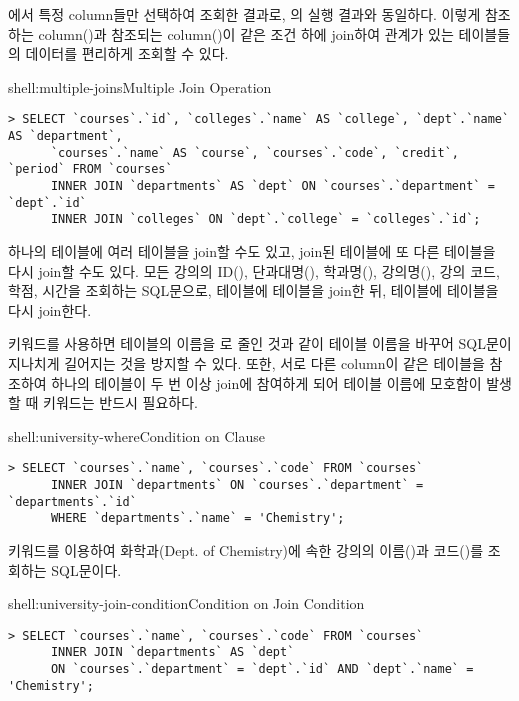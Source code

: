\는 에서 특정 column들만 선택하여 조회한 결과로, 의 실행 결과와 동일하다. 이렇게 참조하는 column()과 참조되는 column()이 같은 조건 하에 join하여 관계가 있는 테이블들의 데이터를 편리하게 조회할 수 있다.
\newpage

\begin{shellenv}{shell:multiple-joins}{Multiple Join Operation}
\begin{verbatim}
> SELECT `courses`.`id`, `colleges`.`name` AS `college`, `dept`.`name` AS `department`,
      `courses`.`name` AS `course`, `courses`.`code`, `credit`, `period` FROM `courses`
      INNER JOIN `departments` AS `dept` ON `courses`.`department` = `dept`.`id`
      INNER JOIN `colleges` ON `dept`.`college` = `colleges`.`id`;
\end{verbatim}
\end{shellenv}

하나의 테이블에 여러 테이블을 join할 수도 있고, join된 테이블에 또 다른 테이블을 다시 join할 수도 있다. \는 모든 강의의 ID(), 단과대명(), 학과명(), 강의명(), 강의 코드, 학점, 시간을 조회하는 SQL문으로,  테이블에  테이블을 join한 뒤,  테이블에  테이블을 다시 join한다.

 키워드를 사용하면  테이블의 이름을 로 줄인 것과 같이 테이블 이름을 바꾸어 SQL문이 지나치게 길어지는 것을 방지할 수 있다. 또한, 서로 다른 column이 같은 테이블을 참조하여 하나의 테이블이 두 번 이상 join에 참여하게 되어 테이블 이름에 모호함이 발생할 때  키워드는 반드시 필요하다.

\begin{shellenv}{shell:university-where}{Condition on  Clause}\begin{verbatim}
> SELECT `courses`.`name`, `courses`.`code` FROM `courses`
      INNER JOIN `departments` ON `courses`.`department` = `departments`.`id`
      WHERE `departments`.`name` = 'Chemistry';
\end{verbatim}
\end{shellenv}

\는  키워드를 이용하여 화학과(Dept. of Chemistry)에 속한 강의의 이름()과 코드()를 조회하는 SQL문이다.

\begin{shellenv}{shell:university-join-condition}{Condition on Join Condition}\begin{verbatim}
> SELECT `courses`.`name`, `courses`.`code` FROM `courses`
      INNER JOIN `departments` AS `dept`
      ON `courses`.`department` = `dept`.`id` AND `dept`.`name` = 'Chemistry';
\end{verbatim}
\end{shellenv}

